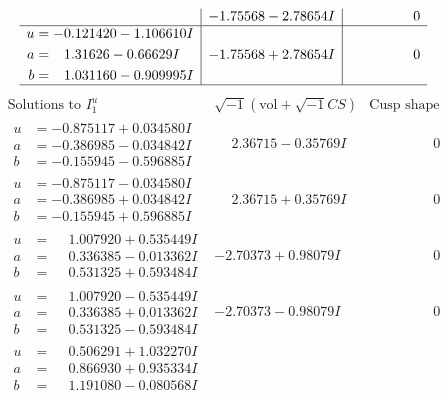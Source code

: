 \documentclass[1p]{elsarticle_modified}
\theoremstyle{definition}
\newcommand{\I}{\sqrt{-1}}
\begin{document}
$$\begin{array}{c|c|c}
 & -1.75568 - 2.78654 I & \phantom{-0.000000 } 0 \\ \hline\begin{aligned}
u &= -0.121420 - 1.106610 I \\
a &= \phantom{-}1.31626 - 0.66629 I \\
b &= \phantom{-}1.031160 - 0.909995 I\end{aligned}
 & -1.75568 + 2.78654 I & \phantom{-0.000000 } 0\\
 \hline 
 \end{array}$$\newpage$$\begin{array}{c|c|c}  
\text{Solutions to }I^u_{1}& \I (\text{vol} + \sqrt{-1}CS) & \text{Cusp shape}\\
 \hline 
\begin{aligned}
u &= -0.875117 + 0.034580 I \\
a &= -0.386985 - 0.034842 I \\
b &= -0.155945 - 0.596885 I\end{aligned}
 & \phantom{-}2.36715 - 0.35769 I & \phantom{-0.000000 } 0 \\ \hline\begin{aligned}
u &= -0.875117 - 0.034580 I \\
a &= -0.386985 + 0.034842 I \\
b &= -0.155945 + 0.596885 I\end{aligned}
 & \phantom{-}2.36715 + 0.35769 I & \phantom{-0.000000 } 0 \\ \hline\begin{aligned}
u &= \phantom{-}1.007920 + 0.535449 I \\
a &= \phantom{-}0.336385 - 0.013362 I \\
b &= \phantom{-}0.531325 + 0.593484 I\end{aligned}
 & -2.70373 + 0.98079 I & \phantom{-0.000000 } 0 \\ \hline\begin{aligned}
u &= \phantom{-}1.007920 - 0.535449 I \\
a &= \phantom{-}0.336385 + 0.013362 I \\
b &= \phantom{-}0.531325 - 0.593484 I\end{aligned}
 & -2.70373 - 0.98079 I & \phantom{-0.000000 } 0 \\ \hline\begin{aligned}
u &= \phantom{-}0.506291 + 1.032270 I \\
a &= \phantom{-}0.866930 + 0.935334 I \\
b &= \phantom{-}1.191080 - 0.080568 I\end{aligned}

\end{array}$$
\end{document}
